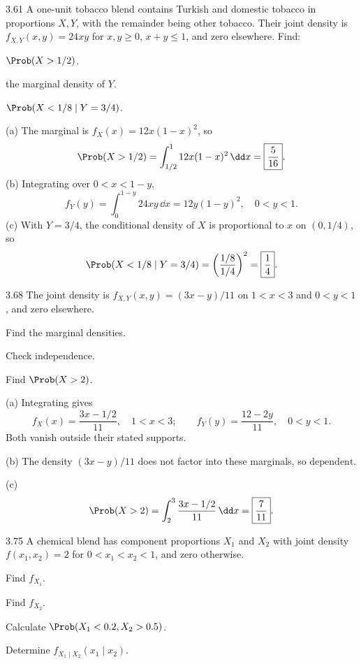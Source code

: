 \documentclass[11pt,oneside]{article}
\begin{document}
\begin{exercise}{3.61}
A one-unit tobacco blend contains Turkish and domestic tobacco in proportions $X,Y$, with the remainder being other tobacco. Their joint density is $f_{X,Y}(x,y)=24xy$ for $x,y\ge0$, $x+y\le1$, and zero elsewhere. Find:
\begin{exercisesubparts}
\item $\Prob(X>1/2)$.
\item the marginal density of $Y$.
\item $\Prob(X<1/8\mid Y=3/4)$.
\end{exercisesubparts}
\end{exercise}

\begin{solution}
\textup{(a)} The marginal is $f_X(x)=12x(1-x)^2$, so
\[
\Prob(X>1/2)=\int_{1/2}^1 12x(1-x)^2\,\dd x=\boxed{\frac5{16}}.
\]
\noindent\textup{(b)} Integrating over $0<x<1-y$,
\[
f_Y(y)=\int_0^{1-y}24xy\,\dd x=\boxed{12y(1-y)^2},\quad0<y<1.
\]
\noindent\textup{(c)} With $Y=3/4$, the conditional density of $X$ is proportional to $x$ on $(0,1/4)$, so
\[
\Prob(X<1/8\mid Y=3/4)=\left(\frac{1/8}{1/4}\right)^2=\boxed{\frac14}.
\]
\end{solution}

\begin{exercise}{3.68}
The joint density is $f_{X,Y}(x,y)=(3x-y)/11$ on $1<x<3$ and $0<y<1$, and zero elsewhere.
\begin{exercisesubparts}
\item Find the marginal densities.
\item Check independence.
\item Find $\Prob(X>2)$.
\end{exercisesubparts}
\end{exercise}

\begin{solution}
\textup{(a)} Integrating gives
\[
f_X(x)=\boxed{\frac{3x-1/2}{11}},\quad1<x<3;
\qquad f_Y(y)=\boxed{\frac{12-2y}{11}},\quad0<y<1.
\]
Both vanish outside their stated supports.\par\medskip
\noindent\textup{(b)} The density $(3x-y)/11$ does not factor into these marginals, so $\boxed{\text{dependent}}$.\par\medskip
\noindent\textup{(c)}
\[
\Prob(X>2)=\int_2^3\frac{3x-1/2}{11}\,\dd x=\boxed{\frac7{11}}.
\]
\end{solution}

\begin{exercise}{3.75}
A chemical blend has component proportions $X_1$ and $X_2$ with joint density $f(x_1,x_2)=2$ for $0<x_1<x_2<1$, and zero otherwise.
\begin{exercisesubparts}
\item Find $f_{X_1}$.
\item Find $f_{X_2}$.
\item Calculate $\Prob(X_1<0.2,X_2>0.5)$.
\item Determine $f_{X_1\mid X_2}(x_1\mid x_2)$.
\end{exercisesubparts}
\end{exercise}
\end{document}
